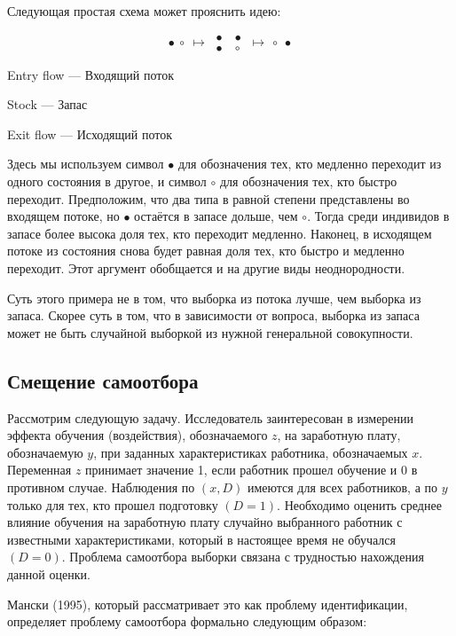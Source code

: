 Следующая простая схема может прояснить идею:

\vspace{3cm}

\[ \bullet \: \circ \: \longmapsto \: \begin{aligned} \bullet &\: \bullet \\ \bullet &\: \circ \end{aligned}  \: \longmapsto \: \circ  \: \bullet \]

Entry flow --- Входящий поток

Stock --- Запас

Exit flow --- Исходящий поток

Здесь мы используем символ $\bullet$ для обозначения тех, кто медленно переходит из одного состояния в другое, и символ $\circ$ для обозначения тех, кто быстро переходит. Предположим, что два типа в равной степени представлены во входящем потоке, но $\bullet$ остаётся в запасе дольше, чем $\circ$. Тогда среди индивидов в запасе более высока доля тех, кто переходит медленно. Наконец, в исходящем потоке из состояния снова будет равная доля тех, кто быстро и медленно переходит. Этот аргумент обобщается и на другие виды неоднородности.


Суть этого примера не в том, что выборка из потока  лучше, чем выборка из запаса. Скорее суть в том, что в зависимости от вопроса, выборка из запаса  может не быть случайной выборкой из нужной генеральной совокупности.



\subsection{Смещение самоотбора}

Рассмотрим следующую задачу. Исследователь заинтересован в измерении эффекта обучения (воздействия), обозначаемого $z$, на заработную плату, обозначаемую $y$, при заданных характеристиках работника, обозначаемых $x$. Переменная $z$ принимает значение 1, если работник прошел обучение и 0 в противном случае. Наблюдения по $(x, D)$ имеются для всех работников, а по $y$ только для тех, кто прошел подготовку $(D = 1)$. Необходимо оценить  среднее влияние обучения на заработную плату случайно выбранного работник с известными характеристиками, который в настоящее время не обучался $(D = 0)$. Проблема самоотбора выборки связана с  трудностью  нахождения данной оценки.


Мански (1995), который рассматривает это как проблему идентификации, определяет проблему самоотбора формально следующим образом:


